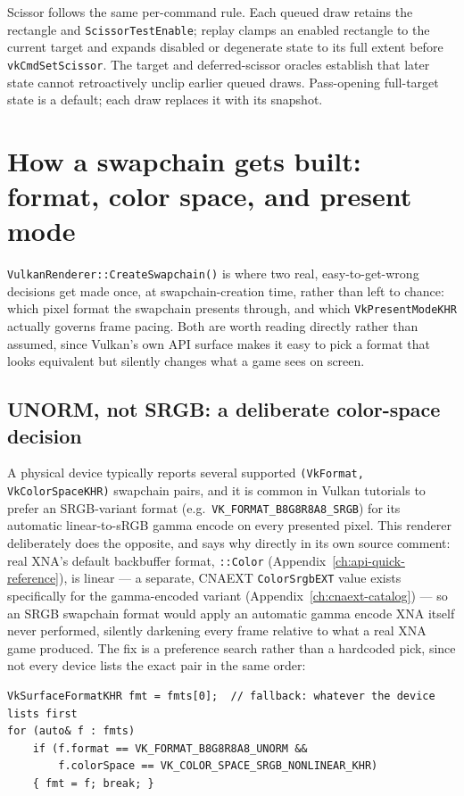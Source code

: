 Scissor follows the same per-command rule. Each queued draw retains the rectangle and
\texttt{ScissorTestEnable}; replay clamps an enabled rectangle to the current target and expands
disabled or degenerate state to its full extent before \texttt{vkCmdSetScissor}. The target and
deferred-scissor oracles establish that later state cannot retroactively unclip earlier queued
draws. Pass-opening full-target state is a default; each draw replaces it with its snapshot.

\section{How a swapchain gets built: format, color space, and present mode}
\label{sec:vulkan-swapchain}

\texttt{VulkanRenderer::CreateSwapchain()} is where two real, easy-to-get-wrong
decisions get made once, at swapchain-creation time, rather than left to chance: which pixel
format the swapchain presents through, and which \texttt{VkPresentModeKHR} actually governs
frame pacing. Both are worth reading directly rather than assumed, since Vulkan's own API
surface makes it easy to pick a format that looks equivalent but silently changes what a game
sees on screen.

\subsection{UNORM, not SRGB: a deliberate color-space decision}

A physical device typically reports several supported \texttt{(VkFormat, VkColorSpaceKHR)}
swapchain pairs, and it is common in Vulkan tutorials to prefer an SRGB-variant format (e.g.\
\texttt{VK\_FORMAT\_B8G8R8A8\_SRGB}) for its automatic linear-to-sRGB gamma encode on every
presented pixel. This renderer deliberately does the opposite, and says why directly in its own
source comment: real XNA's default backbuffer format, \cnans{SurfaceFormat}\texttt{::Color}
(Appendix~\ref{ch:api-quick-reference}), is linear --- a separate,
CNAEXT\allowbreak{} \texttt{ColorSrgbEXT} value exists specifically for the gamma-encoded
variant (Appendix~\ref{ch:cnaext-catalog}) --- so an SRGB swapchain format would apply an automatic gamma encode XNA
itself never performed, silently darkening every frame relative to what a real XNA game
produced. The fix is a preference search rather than a hardcoded pick, since not every device
lists the exact pair in the same order:

\begin{lstlisting}
VkSurfaceFormatKHR fmt = fmts[0];  // fallback: whatever the device lists first
for (auto& f : fmts)
    if (f.format == VK_FORMAT_B8G8R8A8_UNORM &&
        f.colorSpace == VK_COLOR_SPACE_SRGB_NONLINEAR_KHR)
    { fmt = f; break; }
\end{lstlisting}

